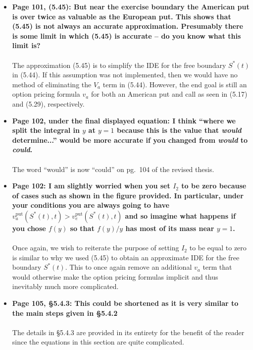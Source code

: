 \documentclass{article}
\begin{document}
\begin{enumerate}
\begin{itemize}
			\item{\textbf{Page 101, (5.45):  But near the exercise boundary the American put is over twice as valuable as the European put. This shows that (5.45) is not always an accurate approximation. Presumably there is some limit in which (5.45) is accurate -- do you know what this limit is?
			\\\\}}
			The approximation (5.45) is to simplify the IDE for the free boundary $S^*(t)$ in (5.44). If this assumption was not implemented, then we would have no method of eliminating the $V_a$ term in (5.44). However, the end goal is still an option pricing formula $v_a$ for both an American put and call as seen in (5.17) and (5.29), respectively.
			
			\item{\textbf{Page 102, under the final displayed equation:  I think ``where we split the integral in $y$ at $y=1$ because this is the value that \emph{would} determine...'' would be more accurate if you changed from \emph{would} to \emph{could}.
			\\\\}}
			The word ``would'' is now ``could'' on pg.~104 of the revised thesis.
			
			\item{\textbf{Page 102:  I am slightly worried when you set $I_2$ to be zero because of cases such as shown in the figure provided. In particular, under your conditions you are always going to have $v_a^{\text{put}}(S^*(t),t) > v_e^{\text{put}}(S^*(t),t)$ and so imagine what happens if you chose $f(y)$ so that $f(y)/y$ has most of its mass near $y=1$.
			\\\\}}
			Once again, we wish to reiterate the purpose of setting $I_2$ to be equal to zero is similar to why we used (5.45) to obtain an approximate IDE for the free boundary $S^*(t)$. This to once again remove an additional $v_a$ term that would otherwise make the option pricing formulas implicit and thus inevitably much more complicated.
			
			\item{\textbf{Page 105, \S5.4.3:  This could be shortened as it is very similar to the main steps given in \S5.4.2
			\\\\}}
			The details in \S5.4.3 are provided in its entirety for the benefit of the reader since the equations in this section are quite complicated.
			

\end{itemize}
\end{enumerate}
\end{document}
